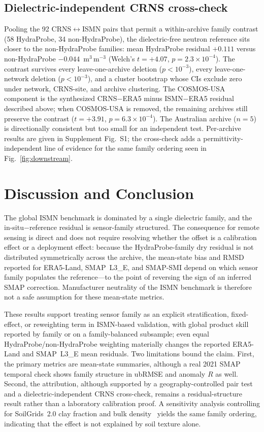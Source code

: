 \documentclass[journal]{IEEEtran}
\begin{document}
\subsection{Dielectric-independent CRNS cross-check}
Pooling the 92 CRNS$\leftrightarrow$ISMN pairs that permit a
within-archive family contrast (58 HydraProbe, 34 non-HydraProbe), the
dielectric-free neutron reference sits closer to the non-HydraProbe
families: mean HydraProbe residual $+0.111$ versus non-HydraProbe
$-0.044$~m$^3$\,m$^{-3}$ (Welch's $t=+4.07$, $p=2.3\times10^{-4}$). The
contrast survives every leave-one-archive deletion ($p<10^{-3}$), every
leave-one-network deletion ($p<10^{-3}$), and a cluster bootstrap whose
CIs exclude zero under network, CRNS-site, and archive clustering. The
COSMOS-USA component is the synthesized CRNS$-$ERA5 minus ISMN$-$ERA5
residual described above; when COSMOS-USA is removed, the remaining
archives still preserve the contrast ($t=+3.91$,
$p=6.3\times10^{-4}$). The Australian archive ($n=5$) is directionally
consistent but too small for an independent test. Per-archive results
are given in Supplement Fig.~S1; the cross-check adds a
permittivity-independent line of evidence for the same family ordering
seen in Fig.~\ref{fig:downstream}.

\section{Discussion and Conclusion}
The global ISMN benchmark is dominated by a single dielectric family,
and the in-situ$-$reference residual is sensor-family structured. The
consequence for remote sensing is direct and does not
require resolving whether the offset is a calibration effect or a
deployment effect: because the HydraProbe-family dry residual is not
distributed symmetrically across the archive, the mean-state bias and
RMSD reported for ERA5-Land, SMAP~L3\_E, and SMAP-SMI depend
on which sensor family populates the reference—to the point of
reversing the sign of an inferred SMAP correction. Manufacturer
neutrality of the ISMN benchmark is therefore not a safe assumption for
these mean-state metrics.

These results support treating sensor family as an explicit
stratification, fixed-effect, or reweighting term in ISMN-based
validation, with global product skill reported by family or on a
family-balanced subsample; even equal HydraProbe/non-HydraProbe
weighting materially changes the reported ERA5-Land and SMAP~L3\_E
mean residuals. Two limitations bound the claim. First, the primary
metrics are mean-state summaries, although a real 2021 SMAP temporal
check shows family structure in ubRMSE and anomaly $R$ as well. Second,
the attribution, although supported by a geography-controlled pair test
and a dielectric-independent CRNS cross-check, remains a
residual-structure result rather than a laboratory calibration proof. A
sensitivity analysis controlling for SoilGrids~2.0 clay fraction and
bulk density~\cite{Poggio2021} yields the same family ordering,
indicating that the effect is not explained by soil texture alone.
\end{document}
